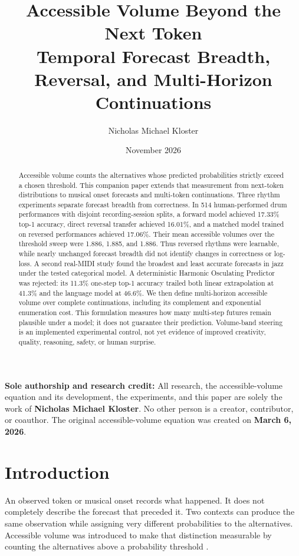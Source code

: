 \documentclass[11pt,a4paper]{article}
\title{\textbf{Accessible Volume Beyond the Next Token}\\[5pt]
\large Temporal Forecast Breadth, Reversal, and Multi-Horizon Continuations}
\author{Nicholas Michael Kloster}
\date{November 2026}
\begin{document}
\maketitle
\thispagestyle{fancy}

\noindent\textbf{Sole authorship and research credit:} All research, the accessible-volume equation and its development, the experiments, and this paper are solely the work of \textbf{Nicholas Michael Kloster}. No other person is a creator, contributor, or coauthor. The original accessible-volume equation was created on \textbf{March 6, 2026}.

\begin{abstract}
Accessible volume counts the alternatives whose predicted probabilities strictly exceed a chosen threshold. This companion paper extends that measurement from next-token distributions to musical onset forecasts and multi-token continuations. Three rhythm experiments separate forecast breadth from correctness. In 514 human-performed drum performances with disjoint recording-session splits, a forward model achieved 17.33\% top-1 accuracy, direct reversal transfer achieved 16.01\%, and a matched model trained on reversed performances achieved 17.06\%. Their mean accessible volumes over the threshold sweep were 1.886, 1.885, and 1.886. Thus reversed rhythms were learnable, while nearly unchanged forecast breadth did not identify changes in correctness or log-loss. A second real-MIDI study found the broadest and least accurate forecasts in jazz under the tested categorical model. A deterministic Harmonic Osculating Predictor was rejected: its 11.3\% one-step top-1 accuracy trailed both linear extrapolation at 41.3\% and the language model at 46.6\%. We then define multi-horizon accessible volume over complete continuations, including its complement and exponential enumeration cost. This formulation measures how many multi-step futures remain plausible under a model; it does not guarantee their prediction. Volume-band steering is an implemented experimental control, not yet evidence of improved creativity, quality, reasoning, safety, or human surprise.
\end{abstract}

\section{Introduction}
An observed token or musical onset records what happened. It does not completely describe the forecast that preceded it. Two contexts can produce the same observation while assigning very different probabilities to the alternatives. Accessible volume was introduced to make that distinction measurable by counting the alternatives above a probability threshold \cite{kloster2026significance}.
\end{document}
